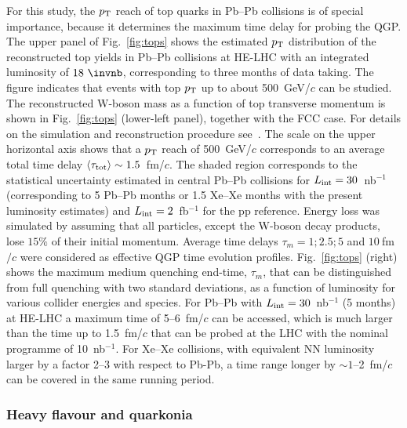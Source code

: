 \documentclass[../report.tex]{subfiles}
\begin{document}
For this study, the $p_{\rm T}$ reach of top quarks in Pb--Pb collisions is of special importance, because it determines the maximum time delay for probing the QGP.
The upper panel of Fig.~\ref{fig:tops} shows the estimated $p_{\rm T}$ distribution
of the reconstructed top yields in Pb--Pb collisions at HE-LHC with an integrated luminosity of $18~\invnb$, corresponding to three months of data taking. The figure indicates that events with top $p\sb{\scriptstyle\mathrm{T}}$ up to about 500~GeV/$c$ can be studied. 
The reconstructed W-boson mass as a function of top transverse
momentum is shown in Fig.~\ref{fig:tops}
(lower-left panel), together with the FCC case. For details on the simulation and reconstruction procedure
see~\cite{Apolinario:2017sob}. The scale on the upper horizontal axis shows that a $p\sb{\scriptstyle\mathrm{T}}$ reach of 500~GeV/$c$ corresponds to an average total time delay $\langle\tau_{\rm tot}\rangle\sim 1.5$~fm/$c$.
The shaded region corresponds to the statistical uncertainty estimated in central Pb--Pb collisions for
$L_{\rm int} = 30$~nb$^{-1}$ (corresponding to 5 Pb--Pb months or 1.5 Xe--Xe months with the present luminosity estimates)
and $L_{\rm int} = 2$~fb$^{-1}$ for the pp reference.
Energy loss was simulated by assuming that all particles, except the W-boson decay products, lose $15\%$ of their initial momentum. 
Average time delays $\tau_m = 1; 2.5; 5$ and $10~$fm$/c$ were considered as effective QGP time evolution profiles. 
Fig.~\ref{fig:tops} (right) shows the maximum medium quenching
end-time, $\tau_m$, that can be distinguished from full quenching with
two standard deviations, as a function of luminosity for various
collider energies and species. For Pb--Pb with $L_{\rm int}=30$~nb$^{-1}$ (5 months) 
at HE-LHC a maximum time of 5--6~fm/$c$ can be accessed, which is much
larger than the time up to 1.5~fm/$c$ that can be probed at the LHC with the nominal programme of 
10~nb$^{-1}$. For Xe--Xe collisions, with equivalent NN luminosity larger by a factor 2--3 with respect to Pb-Pb, 
a time range longer by $\sim 1$--2~fm/$c$ can be covered in the same running period.


\subsubsection{Heavy flavour and quarkonia}
\label{sec:HE_hf}
\end{document}
